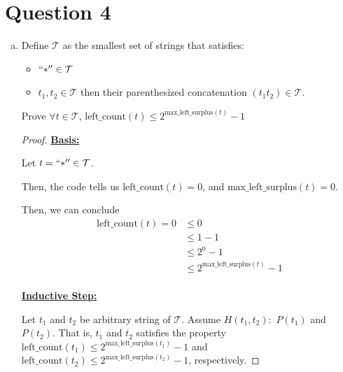 \documentclass[12pt]{article}
\begin{document}

\section*{Question 4}

\bigskip

\begin{enumerate}[a.]
    \item

    Define $\mathcal{T}$ as the smallest set of strings that satisfies:

    \begin{itemize}
        \item $``*'' \in \mathcal{T}$
        \item $t_1, t_2 \in \mathcal{T}$ then their parenthesized concatenation $(t_1t_2) \in \mathcal{T}$.
    \end{itemize}

    \bigskip

    Prove $\forall t \in \mathcal{T}$, $\text{left\_count}(t) \leq 2^{\text{max\_left\_surplus}(t)}-1$

    \bigskip

    \begin{proof}
    \underline{\textbf{Basis:}}

    \bigskip

    Let $t = ``*'' \in \mathcal{T}$.

    \bigskip

    Then, the code tells us $\text{left\_count}(t) = 0$, and $\text{max\_left\_surplus}(t) = 0$.

    \bigskip

    Then, we can conclude
    \setcounter{equation}{0}
    \begin{align}
        \text{left\_count}(t) = 0 &\leq 0\\
        &\leq 1 - 1\\
        &\leq 2^{0} - 1\\
        &\leq 2^{\text{max\_left\_surplus}(t)} - 1\\
    \end{align}

    \bigskip

    \underline{\textbf{Inductive Step:}}

    \bigskip

    Let $t_1$ and $t_2$ be arbitrary string of $\mathcal{T}$. Assume $H(t_1,t_2):$
    $P(t_1)$ and $P(t_2)$. That is, $t_1$ and $t_2$ satisfies the property
    $\text{left\_count}(t_1) \leq 2^{\text{max\_left\_surplus}(t_1)}-1$ and
    $\text{left\_count}(t_2) \leq 2^{\text{max\_left\_surplus}(t_2)}-1$, respectively.


\end{proof}
\end{enumerate}
\end{document}
